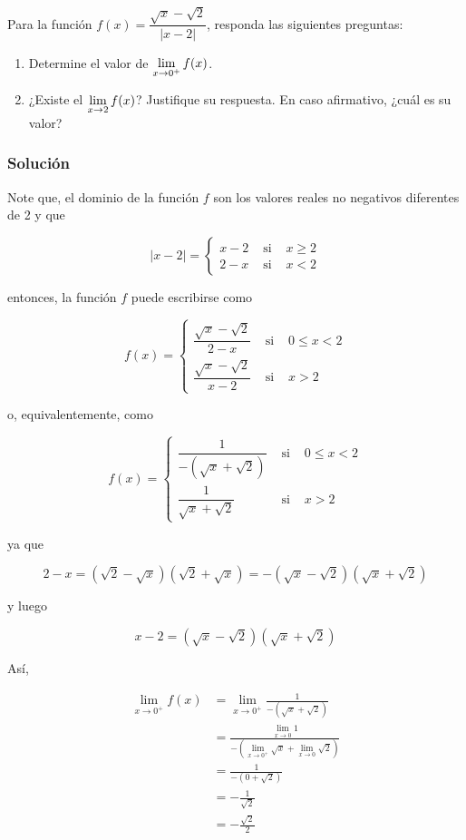 Para la función $f(x)=\dfrac{\sqrt{x}-\sqrt{2}}{|x-2|}$, responda las siguientes preguntas:

\begin{enumerate}[label=\alph*)]
  \item Determine el valor de $\displaystyle\lim _{x \rightarrow 0^{+}} f(x)$.
  \item ¿Existe el $\displaystyle\lim _{x \rightarrow 2} f(x)$? Justifique su respuesta. En caso afirmativo, ¿cuál es su valor?
\end{enumerate}

\begin{soluciones}
  \subsubsection*{Solución}

  Note que, el dominio de la función $f$ son los valores reales no negativos diferentes de 2 y que

  $$
  |x-2|=\left\{\begin{array}{lll}
  x-2 & \text { si } & x \geq 2 \\
  2-x & \text { si } & x<2
  \end{array}\right.
  $$
  
  entonces, la función $f$ puede escribirse como

  $$
  f(x)=\left\{\begin{array}{ccc}
  \dfrac{\sqrt{x}-\sqrt{2}}{2-x} & \text { si } & 0 \leq x<2 \\[15pt]
  \dfrac{\sqrt{x}-\sqrt{2}}{x-2} & \text { si } & x>2
  \end{array}\right.
  $$

  o, equivalentemente, como

  $$
  f(x)=\left\{\begin{array}{lcc}
  \dfrac{1}{-(\sqrt{x}+\sqrt{2})} & \text { si } & 0 \leq x<2 \\[15pt]
  \dfrac{1}{\sqrt{x}+\sqrt{2}} & \text { si } & x>2
  \end{array}\right.
  $$

  ya que

  $$
  2-x=(\sqrt{2}-\sqrt{x})(\sqrt{2}+\sqrt{x})=-(\sqrt{x}-\sqrt{2})(\sqrt{x}+\sqrt{2})
  $$

  y luego

  $$
  x-2=(\sqrt{x}-\sqrt{2})(\sqrt{x}+\sqrt{2})
  $$

  Así,

  $$
  \begin{aligned}
  \lim _{x \rightarrow 0^{+}} f(x) & =\lim _{x \rightarrow 0^{+}} \frac{1}{-(\sqrt{x}+\sqrt{2})} \\
  & =\frac{\lim _{x \rightarrow 0} 1}{-\left(\lim _{x \rightarrow 0^{+}} \sqrt{x}+\lim _{x \rightarrow 0} \sqrt{2}\right)} \\
  & =\frac{1}{-(0+\sqrt{2})} \\
  & =-\frac{1}{\sqrt{2}} \\
  & =-\frac{\sqrt{2}}{2}
  \end{aligned}
  $$


\end{soluciones}
